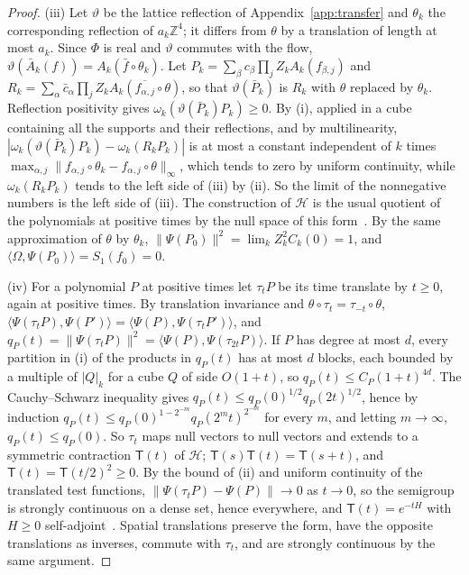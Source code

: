 \documentclass[aps,prd,twocolumn,superscriptaddress,nofootinbib,longbibliography,floatfix,amsmath,amssymb,10pt]{revtex4-2}
\theoremstyle{definition}
\theoremstyle{remark}
\newcommand{\Z}{\mathbb{Z}}
\newcommand{\ip}[2]{\langle #1,#2\rangle}
\begin{document}
\begin{proof}
(iii) Let $\vartheta$ be the lattice reflection of
Appendix~\ref{app:transfer} and $\theta_k$ the corresponding reflection of
$a_k\Z^4$; it differs from $\theta$ by a translation of length at most $a_k$.
Since $\Phi$ is real and $\vartheta$ commutes with the flow,
$\vartheta(\bar A_k(f))=A_k(\bar f\circ\theta_k)$. Let
$P_k=\sum_\beta c_\beta\prod_jZ_kA_k(f_{\beta,j})$ and
$R_k=\sum_\alpha\bar c_\alpha\prod_jZ_kA_k(\overline{f_{\alpha,j}}\circ\theta)$,
so that $\vartheta(\bar P_k)$ is $R_k$ with $\theta$ replaced by $\theta_k$.
Reflection positivity gives $\omega_k(\vartheta(\bar P_k)P_k)\ge0$. By (i),
applied in a cube containing all the supports and their reflections, and by
multilinearity, $|\omega_k(\vartheta(\bar P_k)P_k)-\omega_k(R_kP_k)|$ is at
most a constant independent of $k$ times
$\max_{\alpha,j}\|f_{\alpha,j}\circ\theta_k-f_{\alpha,j}\circ\theta\|_\infty$,
which tends to zero by uniform continuity, while $\omega_k(R_kP_k)$ tends to
the left side of (iii) by (ii). So the limit of the nonnegative
numbers is the left side of (iii). The construction of $\mathcal H$ is the
usual quotient of the polynomials at positive times by the null space of this
form~\cite{OS73}. By the same approximation of $\theta$ by $\theta_k$,
$\|\Psi(P_0)\|^2=\lim_kZ_k^2C_k(0)=1$, and $\ip\Omega{\Psi(P_0)}=S_1(f_0)=0$.

(iv) For a polynomial $P$ at positive times let $\tau_tP$ be its time
translate by $t\ge0$, again at positive times. By translation invariance and
$\theta\circ\tau_t=\tau_{-t}\circ\theta$, $\ip{\Psi(\tau_tP)}{\Psi(P')}=
\ip{\Psi(P)}{\Psi(\tau_tP')}$, and $q_P(t)=\|\Psi(\tau_tP)\|^2=
\ip{\Psi(P)}{\Psi(\tau_{2t}P)}$. If $P$ has degree at most $d$, every
partition in (i) of the products in $q_P(t)$ has at most $d$ blocks, each
bounded by a multiple of $|Q|_k$ for a cube $Q$ of side $O(1+t)$, so
$q_P(t)\le C_P(1+t)^{4d}$. The Cauchy--Schwarz inequality gives
$q_P(t)\le q_P(0)^{1/2}q_P(2t)^{1/2}$, hence by induction
$q_P(t)\le q_P(0)^{1-2^{-m}}q_P(2^mt)^{2^{-m}}$ for every $m$, and letting
$m\to\infty$, $q_P(t)\le q_P(0)$. So $\tau_t$ maps null vectors to null
vectors and extends to a symmetric contraction $\mathsf T(t)$ of $\mathcal
H$; $\mathsf T(s)\mathsf T(t)=\mathsf T(s+t)$, and $\mathsf T(t)=\mathsf
T(t/2)^2\ge0$. By the bound of (ii) and uniform continuity of the translated
test functions, $\|\Psi(\tau_tP)-\Psi(P)\|\to0$ as $t\to0$, so the semigroup
is strongly continuous on a dense set, hence everywhere, and $\mathsf
T(t)=e^{-tH}$ with $H\ge0$ self-adjoint~\cite{OS73}. Spatial translations
preserve the form, have the opposite translations as inverses, commute with
$\tau_t$, and are strongly continuous by the same argument.


\end{proof}
\end{document}
